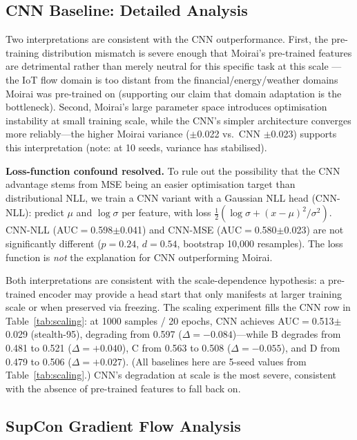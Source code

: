 \subsection{CNN Baseline: Detailed Analysis}
\label{app:cnn_analysis}

Two interpretations are consistent with the CNN outperformance.
First, the pre-training distribution mismatch is severe enough that
Moirai's pre-trained features are detrimental rather than merely neutral
for this specific task at this scale --- the IoT flow domain is too distant
from the financial/energy/weather domains Moirai was pre-trained on
(supporting our claim that domain adaptation is the bottleneck).
Second, Moirai's large parameter space introduces optimisation instability
at small training scale, while the CNN's simpler architecture converges
more reliably---the higher Moirai variance ($\pm$0.022 vs.\ CNN $\pm$0.023)
supports this interpretation (note: at 10 seeds, variance has stabilised).

\textbf{Loss-function confound resolved.}
To rule out the possibility that the CNN advantage stems from MSE being an
easier optimisation target than distributional NLL, we train a CNN variant
with a Gaussian NLL head (CNN-NLL): predict $\mu$ and $\log\sigma$ per feature,
with loss $\frac{1}{2}(\log\sigma + (x - \mu)^2 / \sigma^2)$.
CNN-NLL (AUC$=$0.598$\pm$0.041) and CNN-MSE (AUC$=$0.580$\pm$0.023) are
not significantly different ($p{=}0.24$, $d{=}0.54$, bootstrap 10{,}000 resamples).
The loss function is \emph{not} the explanation for CNN outperforming Moirai.

Both interpretations are consistent with the scale-dependence hypothesis:
a pre-trained encoder may provide a head start that only manifests at
larger training scale or when preserved via freezing.
The scaling experiment fills the CNN row in Table~\ref{tab:scaling}:
at 1000 samples / 20 epochs, CNN achieves AUC$=$0.513$\pm$0.029 (stealth-95),
degrading from 0.597 ($\Delta{=}{-}0.084$)---while B degrades from 0.481 to 0.521
($\Delta{=}{+}0.040$), C from 0.563 to 0.508 ($\Delta{=}{-}0.055$),
and D from 0.479 to 0.506 ($\Delta{=}{+}0.027$).
(All baselines here are 5-seed values from Table~\ref{tab:scaling}.)
CNN's degradation at scale is the most severe, consistent with the absence of
pre-trained features to fall back on.

\subsection{SupCon Gradient Flow Analysis}
\label{app:supcon_gradients}

